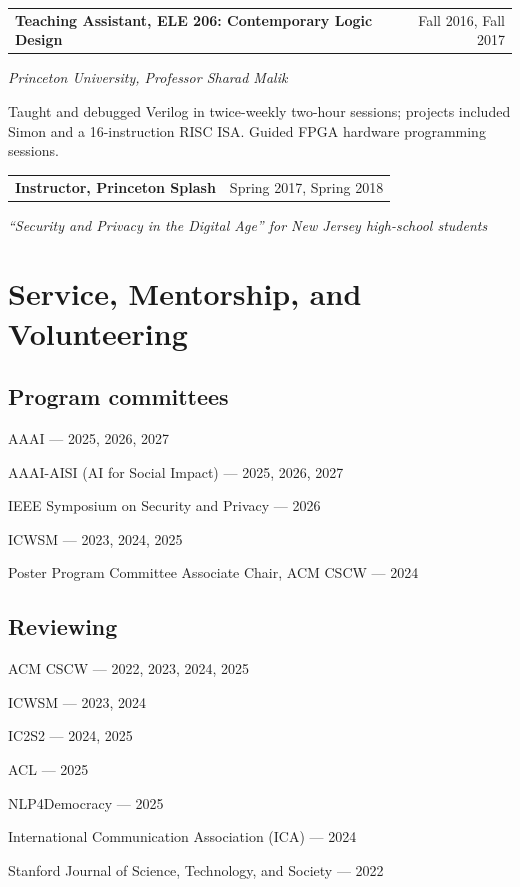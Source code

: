 \documentclass[11pt,letterpaper]{article}
\makeatletter
\newcommand{\entry}[2]{%
  \noindent\begin{tabularx}{\textwidth}{@{}X r@{}}
    #1 & {\small\color{inksoft}#2}
  \end{tabularx}\par
}
\newcommand{\role}[3]{%
  \entry{\textbf{#1}}{#3}%
  {\small\itshape\color{inksoft}#2}\par\vspace{0.15em}
}
\makeatother
\begin{document}
\vspace{0.4em}
\role{Teaching Assistant, ELE 206: Contemporary Logic Design}{Princeton University, Professor Sharad Malik}{Fall 2016, Fall 2017}
\begin{bullets}
  \item Taught and debugged Verilog in twice-weekly two-hour sessions; projects included Simon and a 16-instruction RISC ISA. Guided FPGA hardware programming sessions.
\end{bullets}

\vspace{0.4em}
\role{Instructor, Princeton Splash}{``Security and Privacy in the Digital Age'' for New Jersey high-school students}{Spring 2017, Spring 2018}

\section{Service, Mentorship, and Volunteering}

\subsection*{Program committees}
\begin{tight}
  \item AAAI --- 2025, 2026, 2027
  \item AAAI-AISI (AI for Social Impact) --- 2025, 2026, 2027
  \item IEEE Symposium on Security and Privacy --- 2026
  \item ICWSM --- 2023, 2024, 2025
  \item Poster Program Committee Associate Chair, ACM CSCW --- 2024
\end{tight}

\subsection*{Reviewing}
\begin{tight}
  \item ACM CSCW --- 2022, 2023, 2024, 2025
  \item ICWSM --- 2023, 2024
  \item IC2S2 --- 2024, 2025
  \item ACL --- 2025
  \item NLP4Democracy --- 2025
  \item International Communication Association (ICA) --- 2024
  \item Stanford Journal of Science, Technology, and Society --- 2022
\end{tight}
\end{document}
